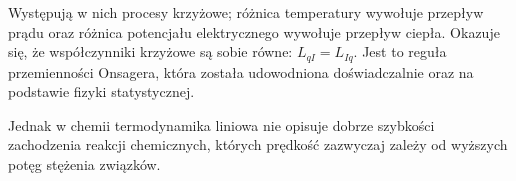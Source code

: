 \documentclass[10pt, a4paper, twoside, onecolumn]{article}
\numberwithin{equation}{section}
\begin{document}
	Występują w nich procesy krzyżowe; różnica temperatury wywołuje przepływ prądu oraz różnica potencjału elektrycznego wywołuje przepływ ciepła.
	Okazuje się, że współczynniki krzyżowe są sobie równe: \(L_{qI}=L_{Iq}\). Jest to reguła przemienności Onsagera, która została udowodniona doświadczalnie oraz na podstawie fizyki statystycznej. \par
	
	Jednak w chemii termodynamika liniowa nie opisuje dobrze szybkości zachodzenia reakcji chemicznych, których prędkość zazwyczaj zależy od wyższych potęg stężenia związków. \par
	
\end{document}
